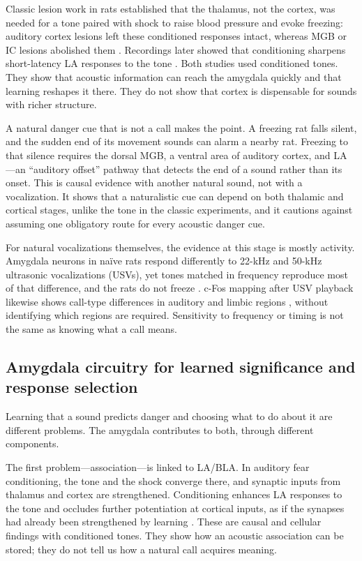 Classic lesion work in rats established that the thalamus, not the cortex, was needed for a tone paired with shock to raise blood pressure and evoke freezing: auditory cortex lesions left these conditioned responses intact, whereas MGB or IC lesions abolished them \citep{LeDouxEtAl1984}. Recordings later showed that conditioning sharpens short-latency LA responses to the tone \citep{QuirkEtAl1995}. Both studies used conditioned tones. They show that acoustic information can reach the amygdala quickly and that learning reshapes it there. They do not show that cortex is dispensable for sounds with richer structure.

A natural danger cue that is not a call makes the point. A freezing rat falls silent, and the sudden end of its movement sounds can alarm a nearby rat. Freezing to that silence requires the dorsal MGB, a ventral area of auditory cortex, and LA \citep{PereiraEtAl2020}---an ``auditory offset'' pathway that detects the end of a sound rather than its onset. This is causal evidence with another natural sound, not with a vocalization. It shows that a naturalistic cue can depend on both thalamic and cortical stages, unlike the tone in the classic experiments, and it cautions against assuming one obligatory route for every acoustic danger cue.

For natural vocalizations themselves, the evidence at this stage is mostly activity. Amygdala neurons in naïve rats respond differently to 22-kHz and 50-kHz ultrasonic vocalizations (USVs), yet tones matched in frequency reproduce most of that difference, and the rats do not freeze \citep{ParsanaEtAl2012a}. c-Fos mapping after USV playback likewise shows call-type differences in auditory and limbic regions \citep{SadanandaEtAl2008,OudaEtAl2016}, without identifying which regions are required. Sensitivity to frequency or timing is not the same as knowing what a call means.

\subsection{Amygdala circuitry for learned significance and response selection}
\label{sec:mechanisms-amygdala}

Learning that a sound predicts danger and choosing what to do about it are different problems. The amygdala contributes to both, through different components.

The first problem---association---is linked to LA/BLA. In auditory fear conditioning, the tone and the shock converge there, and synaptic inputs from thalamus and cortex are strengthened. Conditioning enhances LA responses to the tone \citep{QuirkEtAl1995} and occludes further potentiation at cortical inputs, as if the synapses had already been strengthened by learning \citep{TsvetkovEtAl2002}. These are causal and cellular findings with conditioned tones. They show how an acoustic association can be stored; they do not tell us how a natural call acquires meaning.

